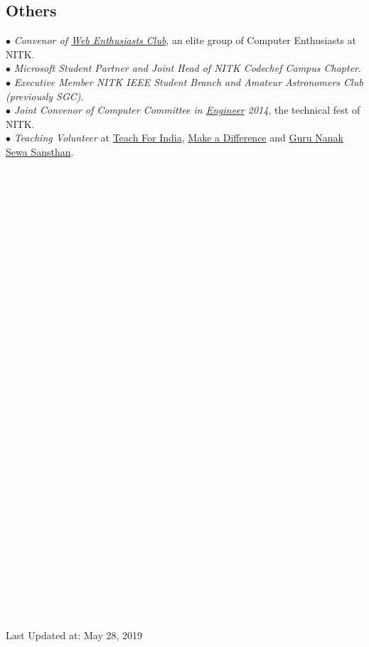 \documentclass[margin,line]{resume}
\begin{document}
\begin{resume}
         
    \section{\mysidestyle \bf Others}
 $\bullet$ {\it Convenor of \href{https://webclub-nitk.github.io/}{Web Enthusiasts Club}}, an elite group of Computer Enthusiasts at NITK. \\
 $\bullet$ {\it Microsoft Student Partner and Joint Head of NITK Codechef Campus Chapter}. \\
     $\bullet$ {\it Executive Member NITK IEEE Student Branch and Amateur Astronomers Club (previously SGC)}. \\
     $\bullet$ {\it Joint Convenor of Computer Committee in \href{http://www.nitk.ac.in/students-activities/engineer}{Engineer} 2014}, the technical fest of NITK. \\
$\bullet$ {\it Teaching Volunteer} at \href{http://www.teachforindia.org/}{Teach For India}, \href{http://makeadiff.in/}{Make a Difference} and \href{https://www.nanakg.org/}{Guru Nanak Sewa Sansthan}.
    \\\\\\\\\\\\\\\\\\\\\\\\\\\\\\\\\\\\\\\\\\\\\\\\\\\\\\\\\\\\\\\\\\\\
\begin{footnotesize}
Last Updated at: May 28, 2019
\end{footnotesize}
\end{resume}
\end{document}
